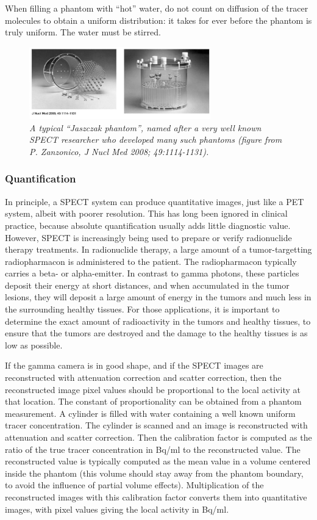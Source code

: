 \documentclass[11pt,oneside]{book}
\begin{document}
When filling a phantom with ``hot'' water, do not count on diffusion of the
tracer molecules to obtain a uniform distribution: it takes for ever before the
phantom is truly uniform. The water must be stirred.
\begin{figure}[tb]
\centering
\includegraphics[width=0.7\textwidth]{figs/fig_jaszczakphantom.pdf}
\caption{\label{fig:jaszczak} \emph{A typical ``Jaszczak phantom'',
    named after a very well known SPECT researcher who developed many
    such phantoms (figure from P. Zanzonico, {\em J Nucl Med} 2008;
    49:1114-1131).}}
\end{figure}

\subsubsection{Quantification} \label{sec:spectquant}
In principle, a SPECT system can produce quantitative images, just
like a PET system, albeit with poorer resolution. This has long been
ignored in clinical practice, because absolute quantification usually
adds little diagnostic value. However, SPECT is increasingly being
used to prepare or verify radionuclide therapy treatments. In
radionuclide therapy, a large amount of a tumor-targetting
radiopharmacon is administered to the patient. The radiopharmacon
typically carries a beta- or alpha-emitter. In contrast to gamma
photons, these particles deposit their energy at short distances, and
when accumulated in the tumor lesions, they will deposit a large
amount of energy in the tumors and much less in the surrounding
healthy tissues. For those applications, it is important to determine
the exact amount of radioactivity in the tumors and healthy tissues,
to ensure that the tumors are destroyed and the damage to the healthy
tissues is as low as possible.

If the gamma camera is in good shape, and if the SPECT images are
reconstructed with attenuation correction and scatter correction, then
the reconstructed image pixel values should be proportional to the
local activity at that location. The constant of proportionality can
be obtained from a phantom measurement. A cylinder is filled with
water containing a well known uniform tracer concentration. The
cylinder is scanned and an image is reconstructed with attenuation and
scatter correction. Then the calibration factor is computed as the
ratio of the true tracer concentration in Bq/ml to the reconstructed
value. The reconstructed value is typically computed as the mean value
in a volume centered inside the phantom (this volume should stay away
from the phantom boundary, to avoid the influence of partial volume
effects). Multiplication of the reconstructed images with this
calibration factor converts them into quantitative images, with pixel
values giving the local activity in Bq/ml.
\end{document}
